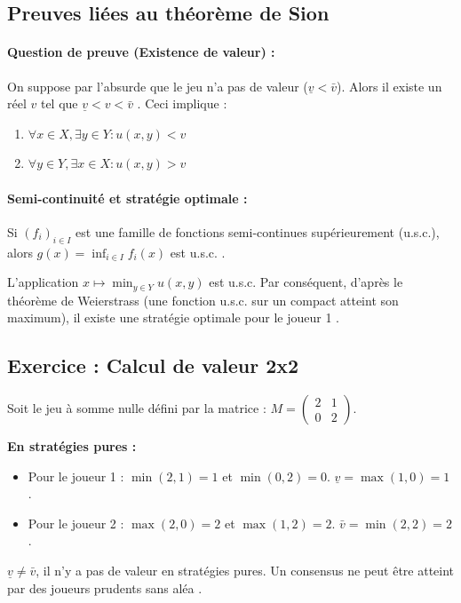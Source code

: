 \subsection{Preuves liées au théorème de Sion}

\paragraph{Question de preuve (Existence de valeur) :}
On suppose par l'absurde que le jeu n'a pas de valeur ($\underline{v} < \bar{v}$). Alors il existe un réel $v$ tel que $\underline{v} < v < \bar{v}$ \cite{Note 3 déc. 2025.pdf}. 
Ceci implique \cite{Note 3 déc. 2025.pdf} :
\begin{enumerate}
    \item $\forall x \in X, \exists y \in Y : u(x, y) < v$
    \item $\forall y \in Y, \exists x \in X : u(x, y) > v$
\end{enumerate}

\paragraph{Semi-continuité et stratégie optimale :}
\begin{lemma}
Si $(f_i)_{i \in I}$ est une famille de fonctions semi-continues supérieurement (u.s.c.), alors $g(x) = \inf_{i \in I} f_i(x)$ est u.s.c. \cite{Note 3 déc. 2025.pdf}.
\end{lemma}

\begin{proposition}
L'application $x \mapsto \min_{y \in Y} u(x, y)$ est u.s.c. Par conséquent, d'après le théorème de Weierstrass (une fonction u.s.c. sur un compact atteint son maximum), il existe une stratégie optimale pour le joueur 1 \cite{Note 3 déc. 2025.pdf}.
\end{proposition}

\subsection{Exercice : Calcul de valeur 2x2}

Soit le jeu à somme nulle défini par la matrice \cite{Note 10 déc. 2025.pdf} :
$M = \begin{pmatrix} 2 & 1 \\ 0 & 2 \end{pmatrix}$.

\textbf{En stratégies pures :}
\begin{itemize}
    \item Pour le joueur 1 : $\min(2,1)=1$ et $\min(0,2)=0$. $\underline{v} = \max(1, 0) = 1$ \cite{Note 10 déc. 2025.pdf}.
    \item Pour le joueur 2 : $\max(2,0)=2$ et $\max(1,2)=2$. $\bar{v} = \min(2, 2) = 2$ \cite{Note 10 déc. 2025.pdf}.
\end{itemize}
$\underline{v} \neq \bar{v}$, il n'y a pas de valeur en stratégies pures. Un consensus ne peut être atteint par des joueurs prudents sans aléa \cite{Note 10 déc. 2025.pdf}.


